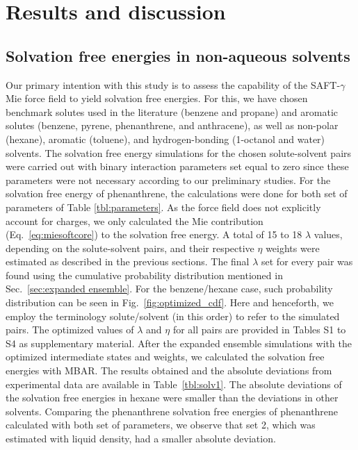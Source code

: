 \documentclass[preprint]{elsarticle}
\begin{document}
	\section{Results and discussion}
	\label{sec:results}
	
	\subsection{Solvation free energies in non-aqueous solvents}
	\label{sec:non-aqueous}
	
	Our primary intention with this study is to assess the capability of the SAFT-$\gamma$ Mie force field to yield solvation free energies. For this, we have chosen benchmark solutes used in the literature (benzene and propane) and aromatic solutes (benzene, pyrene, phenanthrene, and anthracene), as well as non-polar (hexane), aromatic (toluene), and hydrogen-bonding (1-octanol and water) solvents. The solvation free energy simulations for the chosen solute-solvent pairs were carried out with binary interaction parameters set equal to zero since these parameters were not necessary according to our preliminary studies. For the solvation free energy of phenanthrene, the calculations were done for both set of parameters of Table \ref{tbl:parameters}.  As the force field does not explicitly account for charges, we only calculated the Mie contribution (Eq.~\eqref{eq:miesoftcore}) to the solvation free energy. A total of 15 to 18 $\lambda$ values, depending on the solute-solvent pairs, and their respective $\eta$ weights were estimated as described in the previous sections. The final $\lambda$ set for every pair was found using the cumulative probability distribution mentioned in Sec.~\ref{sec:expanded ensemble}. For the benzene/hexane case, such probability distribution can be seen in Fig.~\ref{fig:optimized_cdf}. Here and henceforth, we employ the terminology solute/solvent (in this order) to refer to the simulated pairs. The optimized values of $\lambda$ and $\eta$ for all pairs are provided in Tables S1 to S4 as supplementary material.
	After the expanded ensemble simulations with the optimized intermediate states and weights, we calculated the solvation free energies with MBAR. The results obtained and the absolute deviations from experimental data \cite{doi:10.1021/ci034120c} are available in Table~\ref{tbl:solv1}. The absolute deviations of the solvation free energies in hexane were smaller than the deviations in other solvents. Comparing the phenanthrene solvation free energies of phenanthrene calculated with both set of parameters, we observe that set 2, which was estimated with liquid density, had a  smaller absolute deviation.
\end{document}

